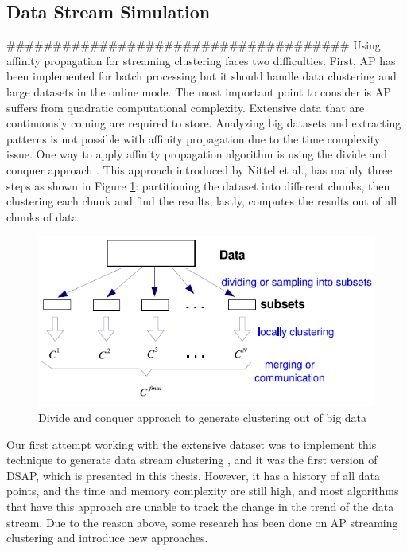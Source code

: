 \documentclass[../UNBThesis2.tex]{subfiles}
\begin{document}
\subsection{Data Stream Simulation}

#####################################
 Using affinity propagation for streaming clustering faces two difficulties. First, AP has been implemented for batch processing but it should handle data clustering and large datasets in the online mode. The most important point to consider is AP suffers from quadratic computational complexity.
Extensive data that are continuously coming are required to store. Analyzing big datasets and extracting patterns is not possible with affinity propagation due to the time complexity issue.
One way to apply affinity propagation algorithm is using the divide and conquer approach \cite{khalilian2016data}. This approach introduced by Nittel et al.\cite{nittel2004scaling}, has mainly three steps as shown in Figure \ref{dividee}: partitioning the dataset into different chunks, then clustering each chunk and find the results, lastly, computes the results out of all chunks of data. 

\begin{figure}[!h]
    \centering
    \includegraphics[width = 11 cm]{image/Chapters/Chapter3/divide.PNG}
    \caption{Divide and conquer approach to generate clustering out of big data \protect\cite{zhang2009toward}}
    \label{dividee}
\end{figure}


Our first attempt working with the extensive dataset was to implement this technique to generate data stream clustering \cite{ivarispatio}, and it was the first version of DSAP, which is presented in this thesis. However, it has a history of all data points, and the time and memory complexity are still high, and most algorithms that have this approach are unable to track the change in the trend of the data stream. 
Due to the reason above, some research has been done on AP streaming clustering and introduce new approaches.
\end{document}
